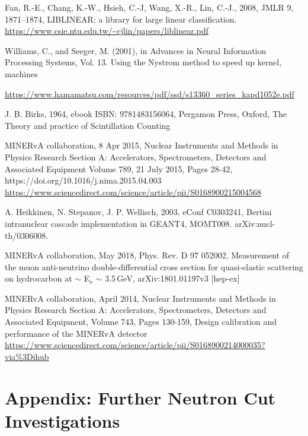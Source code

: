 \documentclass[12pt,a4paper]{article}
\begin{document}
\begin{thebibliography}{9}
 Fan, R.-E., Chang, K.-W., Hsieh, C.-J, Wang, X.-R., Lin, C.-J., 2008, JMLR 9, 1871–1874, LIBLINEAR: a library for large linear classification.  \url{https://www.csie.ntu.edu.tw/~cjlin/papers/liblinear.pdf}

Williams, C., and Seeger, M. (2001), in Advances in Neural Information Processing Systems, Vol. 13. Using the Nystrom method to speed up kernel, machines

\url{https://www.hamamatsu.com/resources/pdf/ssd/s13360_series_kapd1052e.pdf}

J. B. Birks, 1964, ebook ISBN: 9781483156064, Pergamon Press, Oxford, The Theory and practice of Scintillation Counting

MINERvA collaboration, 8 Apr 2015, Nuclear Instruments and Methods in Physics Research Section A: Accelerators, Spectrometers, Detectors and Associated Equipment Volume 789, 21 July 2015, Pages 28-42, https://doi.org/10.1016/j.nima.2015.04.003 \url{https://www.sciencedirect.com/science/article/pii/S0168900215004568}

A. Heikkinen, N. Stepanov, J. P. Wellisch, 2003, eConf C0303241, Bertini intranuclear cascade implementation in GEANT4,  MOMT008. arXiv:nucl-th/0306008.

MINERvA collaboration, May 2018, Phys. Rev. D 97 052002, Measurement of the muon anti-neutrino double-differential cross section for quasi-elastic scattering on hydrocarbon at $\sim$ E$_\nu$ $\sim$ 3.5\,GeV, arXiv:1801.01197v3 [hep-ex]

MINERvA collaboration, April 2014, Nuclear Instruments and Methods in Physics Research Section A: Accelerators, Spectrometers, Detectors and Associated Equipment, Volume 743, Pages 130-159, Design calibration and performance of the MINERvA detector \url{https://www.sciencedirect.com/science/article/pii/S0168900214000035?via\%3Dihub}
\end{thebibliography}


\newpage
\appendix
\section{Appendix: Further Neutron Cut Investigations}
\end{document}

